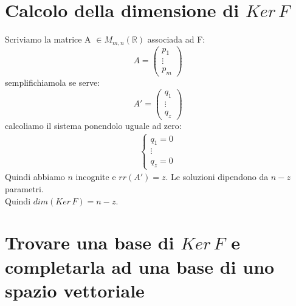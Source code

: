 \documentclass{article}
\begin{document}
\section{Calcolo della dimensione di $Ker \,F$}
Scriviamo la matrice A $\in M_{m,n}(\mathbb{R})$ associada ad F:
\begin{equation*}
    A=\begin{pmatrix}
        p_1 \\
        \vdots \\
        p_m
    \end{pmatrix}
\end{equation*}
semplifichiamola se serve:
\begin{equation*}
    A'=\begin{pmatrix}
        q_1 \\
        \vdots \\
        q_z
    \end{pmatrix}
\end{equation*}
calcoliamo il sistema ponendolo uguale ad zero:
\begin{align*}
    \begin{cases}
        q_1=0 \\
        \vdots \\
        q_z=0
    \end{cases}
\end{align*}
Quindi abbiamo $n$ incognite e $rr(A')=z$. Le soluzioni dipendono da $n-z$ parametri. \\
Quindi $dim(Ker \, F)=n-z$.

\section{Trovare una base di $Ker \, F$ e completarla ad una base di uno spazio vettoriale}
\end{document}
